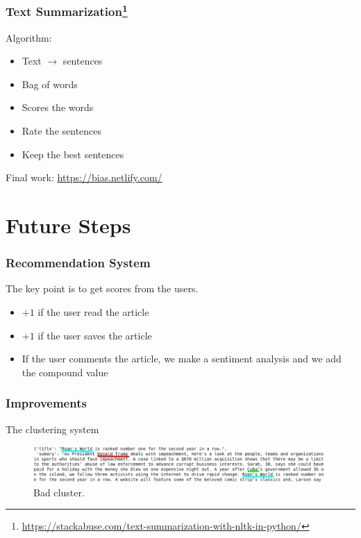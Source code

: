 \documentclass[12pt]{beamer}
\begin{document}
\begin{frame}
\frametitle{Text Summarization\footnote[frame]{\url{https://stackabuse.com/text-summarization-with-nltk-in-python/}} } 
Algorithm:
\begin{itemize}
\item Text $\rightarrow $ sentences \pause
\item Bag of words  \pause
\item Scores the words  \pause
\item Rate the sentences \pause
\item Keep the best sentences 
\end{itemize}


\end{frame}
\begin{frame}
Final work: \url{https://bias.netlify.com/}

\end{frame}
\section{Future Steps}
\begin{frame}
\frametitle{Recommendation System}

The key point is to get scores from the users.
\begin{itemize}
\item $+1$ if the user read the article \pause
\item $+1$ if the user saves the article \pause
\item If the user comments the article, we make a sentiment analysis  and we add the compound value
\end{itemize}
\end{frame}
\begin{frame}
\frametitle{Improvements}

 The clustering system
  
  



\begin{figure}  \label{fig:bad}
  
  
   \includegraphics[width=1.2\textwidth]{bad.png}
  \caption{Bad cluster.}
  \label{fig:bad}
\end{figure}
\end{frame}
\end{document}

